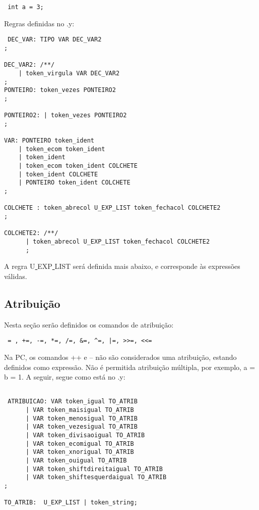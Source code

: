 \documentclass[a4paper,10pt]{article}
\begin{document}
\begin{verbatim}
 int a = 3;
\end{verbatim}

Regras definidas no .y:

\begin{verbatim}
 DEC_VAR: TIPO VAR DEC_VAR2
;

DEC_VAR2: /**/ 
	| token_virgula VAR DEC_VAR2
;
PONTEIRO: token_vezes PONTEIRO2
;

PONTEIRO2: | token_vezes PONTEIRO2
;

VAR: PONTEIRO token_ident
	| token_ecom token_ident
	| token_ident
	| token_ecom token_ident COLCHETE
	| token_ident COLCHETE
	| PONTEIRO token_ident COLCHETE
;

COLCHETE : token_abrecol U_EXP_LIST token_fechacol COLCHETE2
;

COLCHETE2: /**/
      | token_abrecol U_EXP_LIST token_fechacol COLCHETE2
      ;

\end{verbatim}

A regra U\underline{ }EXP\underline{ }LIST será definida mais abaixo, e corresponde às expressões válidas.
\subsection{Atribuição}

Nesta seção serão definidos os comandos de atribuição:

\begin{verbatim}
 = , +=, -=, *=, /=, &=, ^=, |=, >>=, <<=
\end{verbatim}

Na PC, os comandos ++ e -- não são considerados uma atribuição, estando definidos como expressão. Não é permitida atribuição múltipla, por exemplo, a = b = 1. A seguir, segue como está no .y:

\begin{verbatim}

 ATRIBUICAO: VAR token_igual TO_ATRIB
	  | VAR token_maisigual TO_ATRIB
	  | VAR token_menosigual TO_ATRIB
	  | VAR token_vezesigual TO_ATRIB
	  | VAR token_divisaoigual TO_ATRIB
	  | VAR token_ecomigual TO_ATRIB
	  | VAR token_xnorigual TO_ATRIB
	  | VAR token_ouigual TO_ATRIB
	  | VAR token_shiftdireitaigual TO_ATRIB
	  | VAR token_shiftesquerdaigual TO_ATRIB
;

TO_ATRIB:  U_EXP_LIST | token_string;

\end{verbatim}
\end{document}
